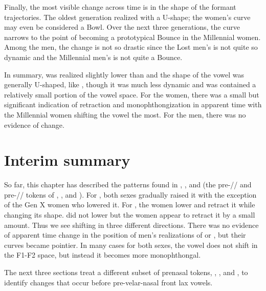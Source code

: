 Finally, the most visible change across time is in the shape of the formant trajectories. The oldest generation realized \bin with a U-shape; the women's curve may even be considered a Bowl. Over the next three generations, the curve narrows to the point of becoming a prototypical Bounce in the Millennial women. Among the men, the change is not so drastic since the Lost men's \bin is not quite so dynamic and the Millennial men's \bin is not quite a Bounce.

In summary, \bin was realized slightly lower than \bit and the shape of the vowel was generally U-shaped, like \ban, though it was much less dynamic and was contained a relatively small portion of the vowel space. For the women, there was a small but significant indication of retraction and monophthongization in apparent time with the Millennial women shifting the vowel the most. For the men, there was no evidence of change.

\section{Interim summary}

So far, this chapter has described the patterns found in \ban, \ben, and \bin (the pre-// and pre-// tokens of \trap, \dress, and \kit). For \ban, both sexes gradually raised it with the exception of the Gen X women who lowered it. For \ben, the women lower and retract it while changing its shape. \bin did not lower but the women appear to retract it by a small amount. Thus we see shifting in three different directions. There was no evidence of apparent time change in the position of men's realizations of \ben or \bin, but their curves became pointier. In many cases for both sexes, the vowel does not shift in the F1-F2 space, but instead it becomes more monophthongal.

The next three sections treat a different subset of prenasal tokens, \bang, \beng, and \bing, to identify changes that occur before pre-velar-nasal front lax vowels.








\section{\bang}
\label{BANG}

